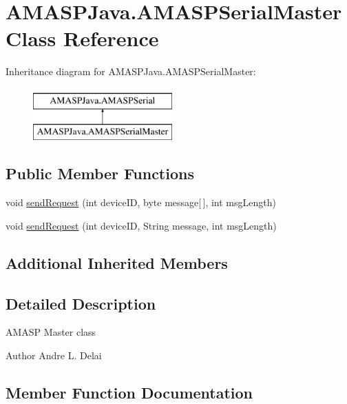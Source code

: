 \hypertarget{class_a_m_a_s_p_java_1_1_a_m_a_s_p_serial_master}{}\section{A\+M\+A\+S\+P\+Java.\+A\+M\+A\+S\+P\+Serial\+Master Class Reference}
\label{class_a_m_a_s_p_java_1_1_a_m_a_s_p_serial_master}
Inheritance diagram for A\+M\+A\+S\+P\+Java.\+A\+M\+A\+S\+P\+Serial\+Master\+:\begin{figure}[H]
\begin{center}
\leavevmode
\includegraphics[height=2.000000cm]{class_a_m_a_s_p_java_1_1_a_m_a_s_p_serial_master}
\end{center}
\end{figure}
\subsection*{Public Member Functions}
\begin{DoxyCompactItemize}
\item 
void \hyperlink{class_a_m_a_s_p_java_1_1_a_m_a_s_p_serial_master_adfcec361015771b99051a3c3ec4041ee}{send\+Request} (int device\+ID, byte message\mbox{[}$\,$\mbox{]}, int msg\+Length)
\item 
void \hyperlink{class_a_m_a_s_p_java_1_1_a_m_a_s_p_serial_master_a2c18db1e26839a2c9038b24170539b26}{send\+Request} (int device\+ID, String message, int msg\+Length)
\end{DoxyCompactItemize}
\subsection*{Additional Inherited Members}


\subsection{Detailed Description}
A\+M\+A\+SP Master class \begin{DoxyAuthor}{Author}
Andre L. Delai 
\end{DoxyAuthor}


\subsection{Member Function Documentation}
\mbox{\label{class_a_m_a_s_p_java_1_1_a_m_a_s_p_serial_master_adfcec361015771b99051a3c3ec4041ee}} 
